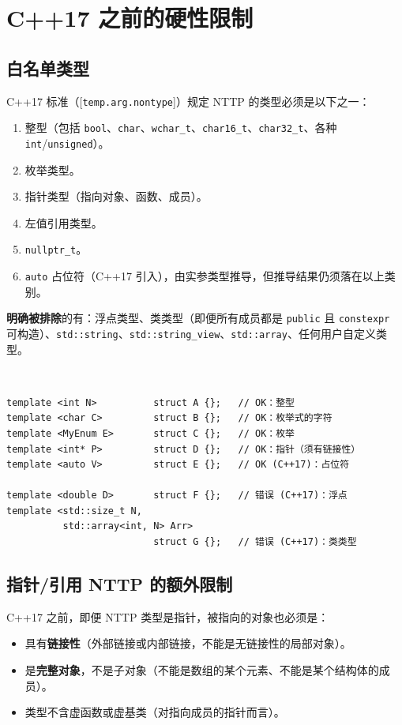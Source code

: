 \documentclass[12pt,a4paper,fontset=fandol]{ctexbook}
\newcommand{\cpplabel}{%
  \tcbox[on line,colback=cppheadbg,colframe=cppheadbg,
    boxrule=0pt,arc=1pt,left=2pt,right=2pt,top=1pt,bottom=1pt,
    colupper=white,fontupper=\scriptsize\bfseries]{C++}}
\newcommand{\cpp}[1]{C++#1}
\newcommand{\kw}[1]{\texttt{#1}}
\begin{document}
\chapter{C++17 之前的硬性限制}

\section{白名单类型}

\cpp{17} 标准（[\texttt{temp.arg.nontype}]）规定 NTTP 的类型必须是以下之一：

\begin{enumerate}
  \item 整型（包括 \kw{bool}、\kw{char}、\kw{wchar\_t}、\kw{char16\_t}、\kw{char32\_t}、各种 \kw{int}/\allowbreak{}\kw{unsigned}）。
  \item 枚举类型。
  \item 指针类型（指向对象、函数、成员）。
  \item 左值引用类型。
  \item \kw{nullptr\_t}。
  \item \kw{auto} 占位符（\cpp{17} 引入），由实参类型推导，但推导结果仍须落在以上类别。
\end{enumerate}

\textbf{明确被排除}的有：浮点类型、类类型（即便所有成员都是 \kw{public} 且 \kw{constexpr} 可构造）、\kw{std::string}、\kw{std::string\_view}、\kw{std::array}、任何用户自定义类型。

\cpplabel\ \begin{lstlisting}
template <int N>          struct A {};   // OK：整型
template <char C>         struct B {};   // OK：枚举式的字符
template <MyEnum E>       struct C {};   // OK：枚举
template <int* P>         struct D {};   // OK：指针（须有链接性）
template <auto V>         struct E {};   // OK (C++17)：占位符

template <double D>       struct F {};   // 错误 (C++17)：浮点
template <std::size_t N,
          std::array<int, N> Arr>
                          struct G {};   // 错误 (C++17)：类类型
\end{lstlisting}

\section{指针/引用 NTTP 的额外限制}

\cpp{17} 之前，即便 NTTP 类型是指针，被指向的对象也必须是：

\begin{itemize}
  \item 具有\textbf{链接性}（外部链接或内部链接，不能是无链接性的局部对象）。
  \item 是\textbf{完整对象}，不是子对象（不能是数组的某个元素、不能是某个结构体的成员）。
  \item 类型不含虚函数或虚基类（对指向成员的指针而言）。
\end{itemize}
\end{document}
